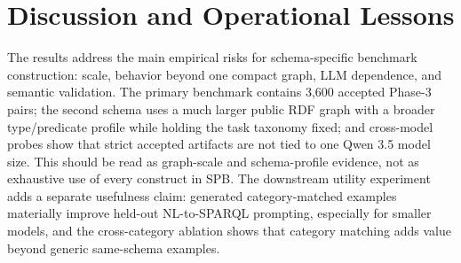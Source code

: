 \documentclass[11pt]{article}
\begin{document}
\begin{table}[t]
  \centering
  \small
  \caption{Downstream utility evaluation on 180 held-out examples per schema/model/setting. Category-RAG uses \(k=3\) generated examples from the same schema and target category, while Cross-cat RAG uses same-schema examples from non-target categories; held-out target records are excluded from every retrieval index.}
  \label{tab:downstream_utility}
\end{table}

\section{Discussion and Operational Lessons}
The results address the main empirical risks for schema-specific benchmark construction: scale, behavior beyond one compact graph, LLM dependence, and semantic validation. The primary benchmark contains 3{,}600 accepted Phase-3 pairs; the second schema uses a much larger public RDF graph with a broader type/predicate profile while holding the task taxonomy fixed; and cross-model probes show that strict accepted artifacts are not tied to one Qwen 3.5 model size. This should be read as graph-scale and schema-profile evidence, not as exhaustive use of every construct in SPB. The downstream utility experiment adds a separate usefulness claim: generated category-matched examples materially improve held-out NL-to-SPARQL prompting, especially for smaller models, and the cross-category ablation shows that category matching adds value beyond generic same-schema examples.
\end{document}
